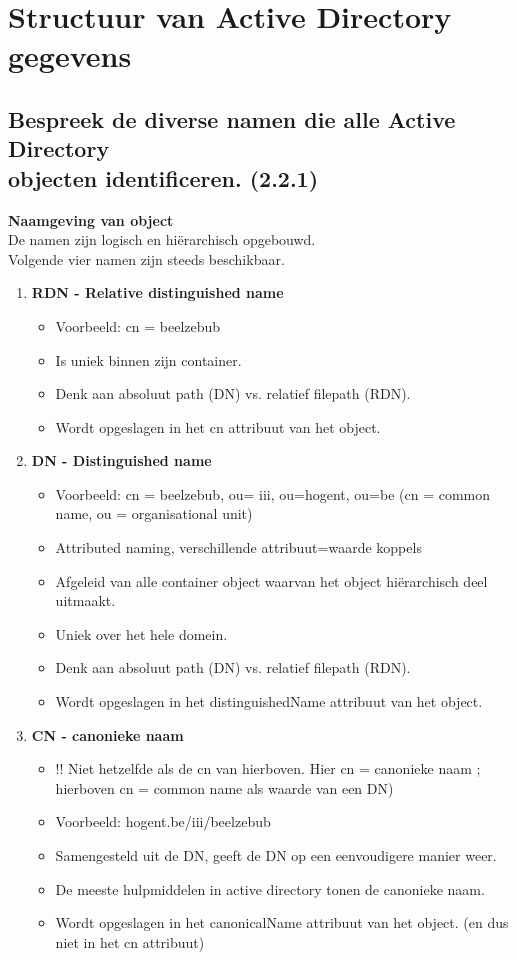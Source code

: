 \chapter{Structuur van Active Directory gegevens}

\section{Bespreek de diverse namen die alle Active Directory\\ objecten identificeren. (2.2.1)}

\textbf{Naamgeving van object}\\
De namen zijn logisch en hi\"erarchisch opgebouwd.\\
Volgende vier namen zijn steeds beschikbaar.

\begin{enumerate}

\item \textbf{RDN - Relative distinguished name}
\begin{itemize}
\item Voorbeeld: cn = beelzebub
\item Is uniek binnen zijn container.
\item Denk aan absoluut path (DN) vs. relatief filepath (RDN).
\item Wordt opgeslagen in het cn attribuut van het object.
\end{itemize}

\item \textbf{DN - Distinguished name}
\begin{itemize}
\item Voorbeeld: cn = beelzebub, ou= iii, ou=hogent, ou=be (cn = common name, ou = organisational unit)
\item Attributed naming, verschillende attribuut=waarde koppels
\item Afgeleid van alle container object waarvan het object hi\"erarchisch deel uitmaakt.
\item Uniek over het hele domein.
\item Denk aan absoluut path (DN) vs. relatief filepath (RDN).
\item Wordt opgeslagen in het distinguishedName attribuut van het object.
\end{itemize}
\clearpage
\item \textbf{CN - canonieke naam}
\begin{itemize}
\item !! Niet hetzelfde als de cn van hierboven. Hier cn = canonieke naam ; hierboven cn = common name als waarde van een DN)
\item Voorbeeld: hogent.be/iii/beelzebub
\item Samengesteld uit de DN, geeft de DN op een eenvoudigere manier weer.
\item De meeste hulpmiddelen in active directory tonen de canonieke naam.
\item Wordt opgeslagen in het canonicalName attribuut van het object. (en dus niet in het cn attribuut)
\end{itemize}


\end{enumerate}
